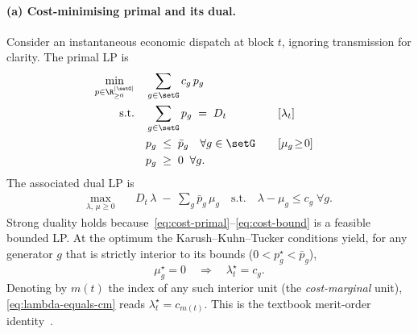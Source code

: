 \paragraph{(a) Cost-minimising primal and its dual.}
Consider an instantaneous economic dispatch at block $t$, ignoring
transmission for clarity.  The primal LP is
\begin{align}
  \min_{p \in \R^{|\setG|}_{\geq 0}}
    \quad & \sum_{g \in \setG} c_g\, p_g
        \label{eq:cost-primal} \\
  \text{s.t.}\quad
    & \sum_{g \in \setG} p_g \;=\; D_t
        \quad &&[\lambda_t]
        \label{eq:cost-balance}\\
    & p_g \;\le\; \bar p_g
        \quad \forall g\in\setG
        \quad &&[\mu_g\!\geq\!0]
        \label{eq:cost-bound}\\
    & p_g \;\geq\; 0 \;\;\forall g.\nonumber
\end{align}
The associated dual LP is
\begin{align}
  \max_{\lambda,\,\mu\geq 0}
  \quad &  D_t\,\lambda \;-\; \sum_{g} \bar p_g\, \mu_g
  \quad
  \text{s.t.}\quad \lambda - \mu_g \le c_g \;\forall g.
  \label{eq:cost-dual}
\end{align}
Strong duality holds because~\eqref{eq:cost-primal}--\eqref{eq:cost-bound}
is a feasible bounded LP.  At the optimum the
Karush--Kuhn--Tucker conditions yield, for any generator $g$ that is
strictly interior to its bounds ($0<p_g^\star<\bar p_g$),
\begin{equation}
  \mu_g^\star = 0
  \quad\Longrightarrow\quad
  \lambda_t^\star = c_g.
  \label{eq:lambda-equals-cm}
\end{equation}
Denoting by $m(t)$ the index of any such interior unit (the
\emph{cost-marginal} unit), \eqref{eq:lambda-equals-cm} reads
$\lambda_t^\star = c_{m(t)}$.  This is the textbook merit-order
identity~\cite{SchweppeBook1988,Hogan1992}.

